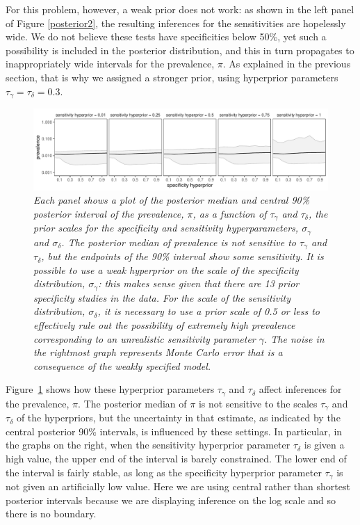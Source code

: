 \documentclass[11pt]{article}
\begin{document}
For this problem, however, a weak prior does not work: as shown in the
left panel of Figure \ref{posterior2}, the resulting inferences for
the sensitivities are hopelessly wide. We do not believe these tests
have specificities below 50\%, yet such a possibility is included in
the posterior distribution, and this in turn propagates to
inappropriately wide intervals for the prevalence, $\pi$.  As
explained in the previous section, that is why we assigned a stronger
prior, using hyperprior parameters $\tau_{\gamma}=\tau_{\delta}=0.3$.

\begin{figure}
  \centerline{\includegraphics[width=\textwidth]{img/prior-sensitivity-2.pdf}}
  \vspace{-.15in}
\caption{\em Each panel shows a plot of the posterior median and central 90\%
  posterior interval of the prevalence, $\pi$, as a function of $\tau_{\gamma}$ and $\tau_{\delta}$, the prior scales for the specificity  and sensitivity
  hyperparameters, $\sigma_{\gamma}$ and $\sigma_{\delta}$.
  The posterior median of prevalence is not sensitive to $\tau_{\gamma}$ and $\tau_{\delta}$, but the endpoints of the 90\% interval show some sensitivity.  It is possible to use a weak hyperprior on the scale of the specificity distribution,  $\sigma_{\gamma}$:  this makes sense given that there are 13 prior specificity studies in the data.  For the scale of the sensitivity distribution,  $\sigma_{\delta}$, it is necessary to use a prior scale of 0.5 or less to effectively rule out the possibility of extremely high prevalence  corresponding to an unrealistic sensitivity parameter $\gamma$.  The noise in the rightmost graph represents Monte Carlo error that is a consequence of the weakly specified model.}\label{prior-sensitivity.fig}
\end{figure}
%
Figure~\ref{prior-sensitivity.fig} shows how these hyperprior
parameters $\tau_{\gamma}$ and $\tau_{\delta}$ affect inferences for
the prevalence, $\pi$.  The posterior median of $\pi$ is not sensitive
to the scales $\tau_{\gamma}$ and $\tau_{\delta}$ of the hyperpriors,
but the uncertainty in that estimate, as indicated by the central
posterior 90\% intervals, is influenced by these settings.  In
particular, in the graphs on the right, when the sensitivity
hyperprior parameter $\tau_{\delta}$ is given a high value, the upper
end of the interval is barely constrained.  The lower end of the
interval is fairly stable, as long as the specificity hyperprior
parameter $\tau_{\gamma}$ is not given an artificially low value. Here
we are using central rather than shortest posterior intervals because
we are displaying inference on the log scale and so there is no
boundary.
\end{document}
